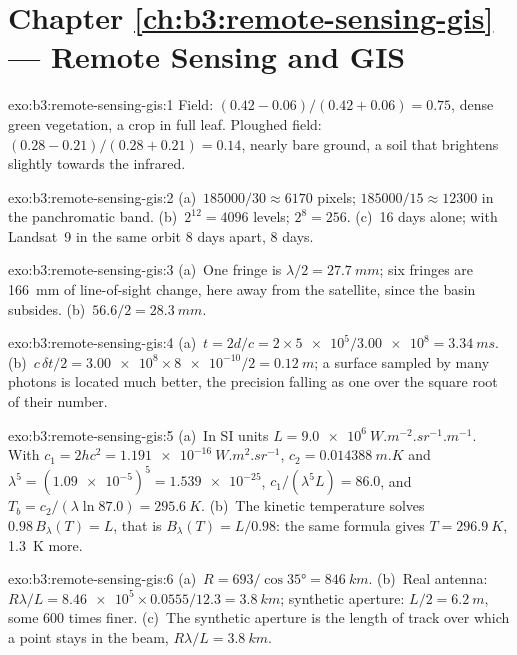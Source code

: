 \section*{Chapter \ref{ch:b3:remote-sensing-gis} --- Remote Sensing and GIS}

\begin{solution}{exo:b3:remote-sensing-gis:1}
Field: $(0.42 - 0.06)/(0.42 + 0.06) = 0.75$, dense green vegetation, a crop
in full leaf. Ploughed field: $(0.28 - 0.21)/(0.28 + 0.21) = 0.14$, nearly
bare ground, a soil that brightens slightly towards the infrared.
\end{solution}

\begin{solution}{exo:b3:remote-sensing-gis:2}
(a)~$185000/30 \approx 6170$ pixels; $185000/15 \approx 12300$ in the
panchromatic band. (b)~$2^{12} = 4096$ levels; $2^8 = 256$. (c)~16 days
alone; with Landsat~9 in the same orbit 8 days apart, 8 days.
\end{solution}

\begin{solution}{exo:b3:remote-sensing-gis:3}
(a)~One fringe is $\lambda/2 = \qty{27.7}{mm}$; six fringes are
\qty{166}{mm} of line-of-sight change, here away from the satellite, since
the basin subsides. (b)~$56.6/2 = \qty{28.3}{mm}$.
\end{solution}

\begin{solution}{exo:b3:remote-sensing-gis:4}
(a)~$t = 2d/c = 2\times\num{5e5}/\num{3.00e8} = \qty{3.34}{ms}$.
(b)~$c\,\delta t/2 = \num{3.00e8}\times\num{8e-10}/2 = \qty{0.12}{m}$; a
surface sampled by many photons is located much better, the precision
falling as one over the square root of their number.
\end{solution}

\begin{solution}{exo:b3:remote-sensing-gis:5}
(a)~In SI units $L = \qty{9.0e6}{W.m^{-2}.sr^{-1}.m^{-1}}$. With $c_1 =
2hc^2 = \qty{1.191e-16}{W.m^2.sr^{-1}}$, $c_2 = \qty{0.014388}{m.K}$ and
$\lambda^5 = (\num{1.09e-5})^5 = \num{1.539e-25}$, $c_1/(\lambda^5L) = 86.0$,
and $T_b = c_2/(\lambda\ln 87.0) = \qty{295.6}{K}$. (b)~The kinetic temperature
solves $0.98\,B_\lambda(T) = L$, that is $B_\lambda(T) = L/0.98$: the same
formula gives $T = \qty{296.9}{K}$, \qty{1.3}{K} more.
\end{solution}

\begin{solution}{exo:b3:remote-sensing-gis:6}
(a)~$R = 693/\cos\ang{35} = \qty{846}{km}$. (b)~Real antenna: $R\lambda/L =
\num{8.46e5}\times0.0555/12.3 = \qty{3.8}{km}$; synthetic aperture: $L/2 =
\qty{6.2}{m}$, some 600 times finer. (c)~The synthetic aperture is the
length of track over which a point stays in the beam, $R\lambda/L =
\qty{3.8}{km}$.
\end{solution}

